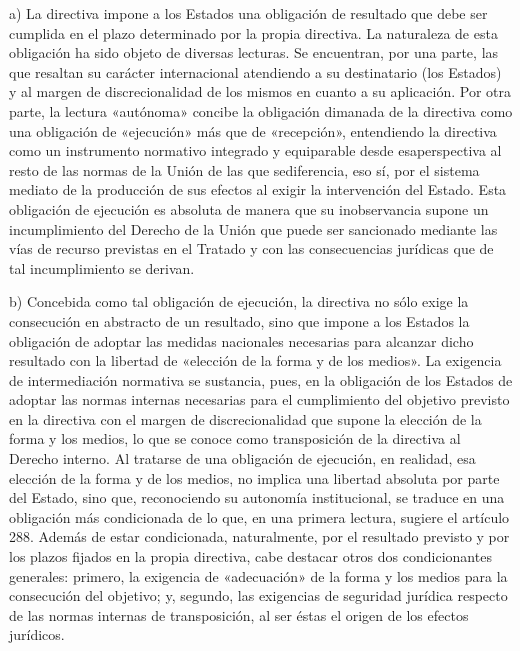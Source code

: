 \documentclass[10pt,a4paper]{article}
\begin{document}
a) La directiva impone a los Estados una obligación de resultado que debe ser cumplida en el plazo determinado por la propia directiva. La naturaleza de esta obligación ha sido objeto de diversas lecturas. Se encuentran, por una parte, las que resaltan su carácter internacional atendiendo a su destinatario (los Estados) y al margen de discrecionalidad de los mismos en cuanto a su aplicación. Por otra parte, la lectura «autónoma» concibe la obligación dimanada de la directiva como una obligación de «ejecución» más que de «recepción», entendiendo la directiva como un instrumento normativo integrado y equiparable desde esaperspectiva al resto de las normas de la Unión de las que sediferencia, eso sí, por el sistema mediato de la producción de sus efectos al exigir la intervención del Estado. Esta obligación de ejecución es absoluta de manera que su inobservancia supone un incumplimiento del Derecho de la Unión que puede ser sancionado mediante las vías de recurso previstas en el Tratado y con las consecuencias jurídicas que de tal incumplimiento se derivan.

b) Concebida como tal obligación de ejecución, la directiva no sólo exige la consecución en abstracto de un resultado, sino que impone a los Estados la obligación de adoptar las medidas nacionales necesarias para alcanzar dicho resultado con la libertad de «elección de la forma y de los medios». La exigencia de intermediación normativa se sustancia, pues, en la obligación de los Estados de adoptar las normas internas necesarias para el cumplimiento del objetivo previsto en la directiva con el margen de discrecionalidad que supone la elección de la forma y los medios, lo que se conoce como transposición de la directiva al Derecho interno. 
Al tratarse de una obligación de ejecución, en realidad, esa elección de la forma y de los medios, no implica una libertad absoluta por parte del Estado, sino que, reconociendo su autonomía institucional, se traduce en una obligación más condicionada de lo que, en una primera lectura, sugiere el artículo 288. Además de estar condicionada, naturalmente, por el resultado previsto y por los plazos fijados en la propia directiva, cabe destacar otros dos condicionantes generales: primero, la exigencia de «adecuación» de la forma y los medios para la consecución del objetivo; y, segundo, las exigencias de seguridad jurídica respecto de las normas internas de transposición, al ser éstas el origen de los efectos jurídicos. 
\end{document}
